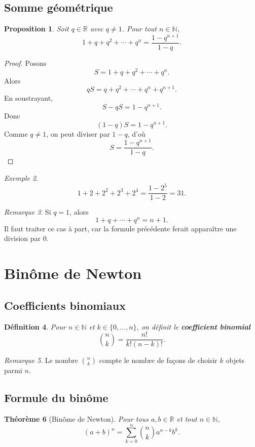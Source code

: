 \documentclass[11pt,a4paper]{article}
\newtheorem{definition}{Définition}[section]
\newtheorem{theoreme}[definition]{Théorème}
\newtheorem{proposition}[definition]{Proposition}
\theoremstyle{remark}
\newtheorem{remarque}[definition]{Remarque}
\newtheorem{exemple}[definition]{Exemple}
\newcommand{\R}{\mathbb{R}}
\newcommand{\N}{\mathbb{N}}
\begin{document}
\subsection{Somme géométrique}

\begin{proposition}
Soit \(q\in\R\) avec \(q\neq 1\). Pour tout \(n\in\N\),
\[
1+q+q^2+\cdots+q^n=\frac{1-q^{n+1}}{1-q}.
\]
\end{proposition}

\begin{proof}
Posons
\[
S=1+q+q^2+\cdots+q^n.
\]
Alors
\[
qS=q+q^2+\cdots+q^n+q^{n+1}.
\]
En soustrayant,
\[
S-qS=1-q^{n+1}.
\]
Donc
\[
(1-q)S=1-q^{n+1}.
\]
Comme \(q\neq 1\), on peut diviser par \(1-q\), d’où
\[
S=\frac{1-q^{n+1}}{1-q}.
\]
\end{proof}

\begin{exemple}
\[
1+2+2^2+2^3+2^4=\frac{1-2^5}{1-2}=31.
\]
\end{exemple}

\begin{remarque}
Si \(q=1\), alors
\[
1+q+\cdots+q^n=n+1.
\]
Il faut traiter ce cas à part, car la formule précédente ferait apparaître une division par \(0\).
\end{remarque}

\section{Binôme de Newton}

\subsection{Coefficients binomiaux}

\begin{definition}
Pour \(n\in\N\) et \(k\in\{0,\dots,n\}\), on définit le \textbf{coefficient binomial}
\[
\binom{n}{k}=\frac{n!}{k!(n-k)!}.
\]
\end{definition}

\begin{remarque}
Le nombre \(\binom{n}{k}\) compte le nombre de façons de choisir \(k\) objets parmi \(n\).
\end{remarque}

\subsection{Formule du binôme}

\begin{theoreme}[Binôme de Newton]
Pour tous \(a,b\in\R\) et tout \(n\in\N\),
\[
(a+b)^n=\sum_{k=0}^n \binom{n}{k}a^{n-k}b^k.
\]
\end{theoreme}
\end{document}
